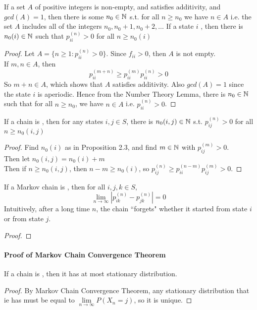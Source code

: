 \documentclass[11pt]{article}
\newcommand{\limit}[1]{\underset{{#1} \rightarrow \infty}{\lim}}
\newcommand{\dur}[3]{{#1}_{#2}^{({#3})}}
\begin{document}
     If a set $A$ of positive integers is non-empty, and satisfies additivity, and $gcd(A) = 1$, then there is some $n_0 \in \mathbb{N}$ s.t. for all $n \geq n_0$ we have $n \in A$ i.e. the set $A$ includes all of the integers $n_0, n_0 + 1, n_0 + 2, \hdots$
    \proposition If a state $i$ , then there is $n_0(i) \in \mathbb{N}$ such that $p_{ii}^{(n)} > 0$ for all $n \geq n_0(i)$
    \begin{proof}
    	Let $A = \{ n \geq 1: \dur{p}{ii}{n} > 0\}$. Since $f_{ii} > 0$, then $A$ is not empty.\\
    	If $m, n \in A$, then $$\dur{p}{ii}{m+n} \geq \dur{p}{ii}{m} \dur{p}{ii}{n} > 0$$
    	So $m+n \in A$, which shows that $A$ satisfies additivity. Also $gcd(A) = 1$ since the state $i$ is aperiodic. Hence from the Number Theory Lemma, there is $n_0 \in \mathbb{N}$ such that for all $n \geq n_0$, we have $n \in A$ i.e. $\dur{p}{ii}{n} > 0$.
    	
    \end{proof}
    
    \corollary If a chain is , then for any states $i, j \in S$, there is $n_0(i,j) \in \mathbb{N}$ s.t. $p_{ij}^{(n)} > 0$ for all $n \geq n_0(i, j)$
    \begin{proof}
    	Find $n_0(i)$ as in Proposition 2.3, and find $m \in \mathbb{N}$ with $p_{ij}^{(m)} > 0$.\\
    	Then let $n_0(i,j) = n_0(i) + m$ \\
    	Then if $n \geq n_0(i,j)$, then $n - m \geq n_0(i)$, so $\dur{p}{ij}{n} \geq \dur{p}{ii}{n-m}\dur{p}{ij}{m} > 0$.
    \end{proof}
    
     If a Markov chain is , then for all $i, j, k \in S$, 
    $$\limit{n} \left| \dur{p}{ik}{n} - \dur{p}{jk}{n} \right | = 0$$
    \remark
    Intuitively, after a long time $n$, the chain ``forgets" whether it started from state $i$ or from state $j$.
    \begin{proof}
    \end{proof}
    \paragraph{Proof of Markov Chain Convergence Theorem}
    \corollary If a chain is , then it has at most  stationary distribution.
    \begin{proof}
    	By Markov Chain Convergence Theorem, any stationary distribution that ie has must be equal to $\limit{n} P(X_n = j)$, so it is unique.
    \end{proof}
    
    
    
    
    
    
    
    
    
    
    
\end{document}
